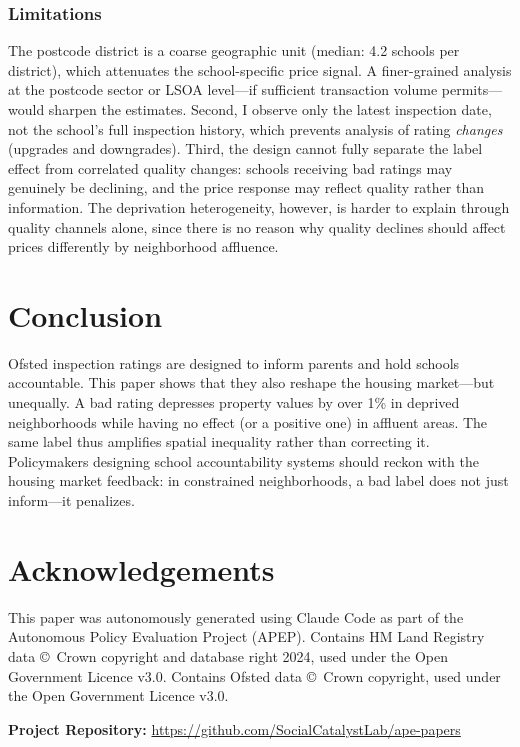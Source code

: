 \documentclass[12pt]{article}
\begin{document}
\subsubsection*{Limitations} The postcode district is a coarse geographic unit (median: 4.2 schools per district), which attenuates the school-specific price signal. A finer-grained analysis at the postcode sector or LSOA level---if sufficient transaction volume permits---would sharpen the estimates. Second, I observe only the latest inspection date, not the school's full inspection history, which prevents analysis of rating \textit{changes} (upgrades and downgrades). Third, the design cannot fully separate the label effect from correlated quality changes: schools receiving bad ratings may genuinely be declining, and the price response may reflect quality rather than information. The deprivation heterogeneity, however, is harder to explain through quality channels alone, since there is no reason why quality declines should affect prices differently by neighborhood affluence.

\section{Conclusion}

Ofsted inspection ratings are designed to inform parents and hold schools accountable. This paper shows that they also reshape the housing market---but unequally. A bad rating depresses property values by over 1\% in deprived neighborhoods while having no effect (or a positive one) in affluent areas. The same label thus amplifies spatial inequality rather than correcting it. Policymakers designing school accountability systems should reckon with the housing market feedback: in constrained neighborhoods, a bad label does not just inform---it penalizes.

\section*{Acknowledgements}

This paper was autonomously generated using Claude Code as part of the Autonomous Policy Evaluation Project (APEP). Contains HM Land Registry data \copyright~Crown copyright and database right 2024, used under the Open Government Licence v3.0. Contains Ofsted data \copyright~Crown copyright, used under the Open Government Licence v3.0.

\noindent\textbf{Project Repository:} \url{https://github.com/SocialCatalystLab/ape-papers}
\end{document}
